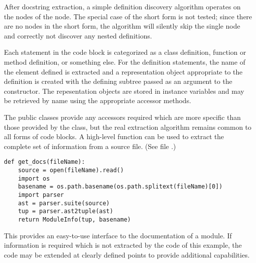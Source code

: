 After docstring extraction, a simple definition discovery
algorithm operates on the  nodes of the
 node.  The special case of the short form is not
tested; since there are no  nodes in the short form,
the algorithm will silently skip the single 
node and correctly not discover any nested definitions.

Each statement in the code block is categorized as
a class definition, function or method definition, or
something else.  For the definition statements, the name of the
element defined is extracted and a representation object
appropriate to the definition is created with the defining subtree
passed as an argument to the constructor.  The repesentation objects
are stored in instance variables and may be retrieved by name using
the appropriate accessor methods.

The public classes provide any accessors required which are more
specific than those provided by the  class, but
the real extraction algorithm remains common to all forms of code
blocks.  A high-level function can be used to extract the complete set
of information from a source file.  (See file .)

\begin{verbatim}
def get_docs(fileName):
    source = open(fileName).read()
    import os
    basename = os.path.basename(os.path.splitext(fileName)[0])
    import parser
    ast = parser.suite(source)
    tup = parser.ast2tuple(ast)
    return ModuleInfo(tup, basename)
\end{verbatim}
%
This provides an easy-to-use interface to the documentation of a
module.  If information is required which is not extracted by the code
of this example, the code may be extended at clearly defined points to
provide additional capabilities.

\begin{seealso}



\end{seealso}
